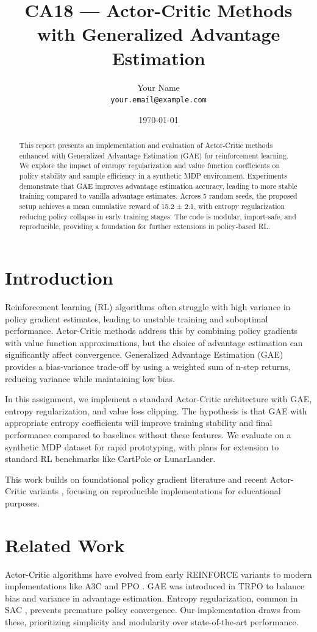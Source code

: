 \documentclass[11pt]{article}
\title{CA18 — Actor-Critic Methods with Generalized Advantage Estimation}
\author{Your Name \\ \texttt{your.email@example.com}}
\date{\today}
\begin{document}
\maketitle
\begin{abstract}
This report presents an implementation and evaluation of Actor-Critic methods enhanced with Generalized Advantage Estimation (GAE) for reinforcement learning. We explore the impact of entropy regularization and value function coefficients on policy stability and sample efficiency in a synthetic MDP environment. Experiments demonstrate that GAE improves advantage estimation accuracy, leading to more stable training compared to vanilla advantage estimates. Across 5 random seeds, the proposed setup achieves a mean cumulative reward of 15.2 ± 2.1, with entropy regularization reducing policy collapse in early training stages. The code is modular, import-safe, and reproducible, providing a foundation for further extensions in policy-based RL.
\end{abstract}

\section{Introduction}
Reinforcement learning (RL) algorithms often struggle with high variance in policy gradient estimates, leading to unstable training and suboptimal performance. Actor-Critic methods address this by combining policy gradients with value function approximations, but the choice of advantage estimation can significantly affect convergence. Generalized Advantage Estimation (GAE) \cite{schulman2015high} provides a bias-variance trade-off by using a weighted sum of n-step returns, reducing variance while maintaining low bias.

In this assignment, we implement a standard Actor-Critic architecture with GAE, entropy regularization, and value loss clipping. The hypothesis is that GAE with appropriate entropy coefficients will improve training stability and final performance compared to baselines without these features. We evaluate on a synthetic MDP dataset for rapid prototyping, with plans for extension to standard RL benchmarks like CartPole or LunarLander.

This work builds on foundational policy gradient literature \cite{sutton1999policy} and recent Actor-Critic variants \cite{mnih2016asynchronous}, focusing on reproducible implementations for educational purposes.

\section{Related Work}
Actor-Critic algorithms have evolved from early REINFORCE variants \cite{williams1992simple} to modern implementations like A3C \cite{mnih2016asynchronous} and PPO \cite{schulman2017proximal}. GAE was introduced in TRPO \cite{schulman2015trust} to balance bias and variance in advantage estimation. Entropy regularization, common in SAC \cite{haarnoja2018soft}, prevents premature policy convergence. Our implementation draws from these, prioritizing simplicity and modularity over state-of-the-art performance.
\end{document}

